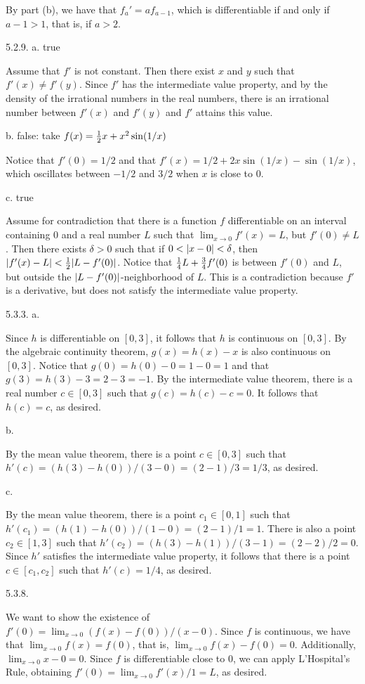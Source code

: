 By part (b), we have that $f_a' = af_{a-1}$,
which is differentiable if and only if $a - 1 > 1$, that is,
if $a > 2$.
\bigskip
\item{5.2.9.} a. true

Assume that $f'$ is not constant.
Then there exist $x$ and $y$ such that $f'(x) \ne f'(y)$.
Since $f'$ has the intermediate value property,
and by the density of the irrational numbers in the real numbers,
there is an irrational number between $f'(x)$ and $f'(y)$
and $f'$ attains this value.
\medskip
\item{} b. false: take $f(x) = {1 \over 2} x + x^2 \sin (1/x)$

Notice that $f'(0) = 1/2$ and that
$f'(x) = 1/2 + 2x \sin (1/x) - \sin (1/x)$,
which oscillates between $-1/2$ and $3/2$ when $x$ is close to $0$.
\medskip
\item{} c. true

Assume for contradiction that there is a function $f$
differentiable on an interval containing $0$ and a real number $L$
such that $\lim _{x \to 0} f'(x) = L$, but $f'(0) \ne L$.
Then there exists $\delta > 0$ such that if $0 < \vert x - 0\vert < \delta$,
then $\vert f'(x) - L\vert < {1 \over 2} \vert L - f'(0)\vert$.
Notice that ${1 \over 4} L + {3 \over 4} f'(0)$ is between $f'(0)$ and $L$,
but outside the $\vert L - f'(0)\vert$-neighborhood of $L$.
This is a contradiction because
$f'$ is a derivative, but does not satisfy the intermediate value property.
\bigskip
\item{5.3.3.} a.

Since $h$ is differentiable on $[0,3]$,
it follows that $h$ is continuous on $[0,3]$.
By the algebraic continuity theorem,
$g(x) = h(x) - x$ is also continuous on $[0,3]$.
Notice that $g(0) = h(0) - 0 = 1 - 0 = 1$
and that $g(3) = h(3) - 3 = 2 - 3 = -1$.
By the intermediate value theorem,
there is a real number $c \in [0,3]$ such that $g(c) = h(c) - c = 0$.
It follows that $h(c) = c$, as desired.
\goodbreak
\item{} b.

By the mean value theorem,
there is a point $c \in [0,3]$ such that
$h'(c) = (h(3) - h(0)) / (3 - 0) = (2 - 1) / 3 = 1/3$,
as desired.
\medskip
\item{} c.

By the mean value theorem, there is a point $c_1 \in [0,1]$ such that
$h'(c_1) = (h(1) - h(0)) / (1 - 0) = (2 - 1) / 1 = 1$.
There is also a point $c_2 \in [1,3]$ such that
$h'(c_2) = (h(3) - h(1)) / (3 - 1) = (2 - 2) / 2 = 0$.
Since $h'$ satisfies the intermediate value property,
it follows that there is a point $c \in [c_1, c_2]$ such that
$h'(c) = 1/4$, as desired.
\bigskip
\item{5.3.8.}

We want to show the existence of
$f'(0) = \lim _{x \to 0} (f(x) - f(0)) / (x - 0)$.
Since $f$ is continuous, we have that $\lim _{x \to 0} f(x) = f(0)$, that is,
$\lim _{x \to 0} f(x) - f(0) = 0$.
Additionally, $\lim _{x \to 0} x - 0 = 0$.
Since $f$ is differentiable close to $0$, we can apply L'Hospital's Rule,
obtaining $f'(0) = \lim _{x \to 0} f'(x) / 1 = L$, as desired.
\bye

